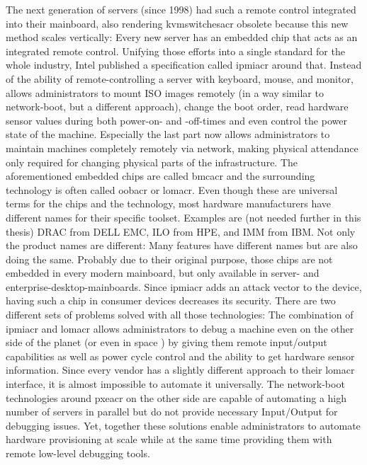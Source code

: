 The next generation of servers (since 1998) had such a remote control integrated into their mainboard, also rendering \gls{kvmswitchesacr} obsolete because this new method scales vertically: Every new server has an embedded chip that acts as an integrated remote control. Unifying those efforts into a single standard for the whole industry, Intel published a specification called \gls{ipmiacr} around that. Instead of  the ability of remote-controlling a server with keyboard, mouse, and monitor,  allows administrators to mount ISO images remotely (in a way similar to network-boot, but a different approach), change the boot order, read hardware sensor values during both power-on- and -off-times and even control the power state of the machine. Especially the last part now allows administrators to maintain machines completely remotely via network, making physical attendance only required for changing physical parts of the infrastructure. 
The aforementioned embedded chips are called \gls{bmcacr} and the surrounding technology is often called \gls{oobacr} or \gls{lomacr}. Even though these are universal terms for the chips and the technology, most hardware manufacturers have different names for their specific toolset. Examples are (not needed further in this thesis) DRAC from DELL EMC, ILO from HPE, and IMM from IBM. Not only the product names are different: Many features have different names but are also doing the same. Probably due to their original purpose, those chips are not embedded in every modern mainboard, but only available in server- and enterprise-desktop-mainboards. Since \gls{ipmiacr} adds an attack vector to the device, having such a chip in consumer devices decreases its security.
\newline
There are two different sets of problems solved with all those technologies:
The combination of \gls{ipmiacr} and \gls{lomacr} allows administrators to debug a machine even on the other side of the planet (or even in space \cite{spacex_servers}) by giving them remote input/output capabilities as well as power cycle control and the ability to get hardware sensor information. Since every vendor has a slightly different approach to their \gls{lomacr} interface, it is almost impossible to automate it universally.
The network-boot technologies around \gls{pxeacr} on the other side are capable of automating a high number of servers in parallel but do not provide necessary Input/Output for debugging issues.
\newline
Yet, together these solutions enable administrators to automate hardware provisioning at scale while at the same time providing them with remote low-level debugging tools.
